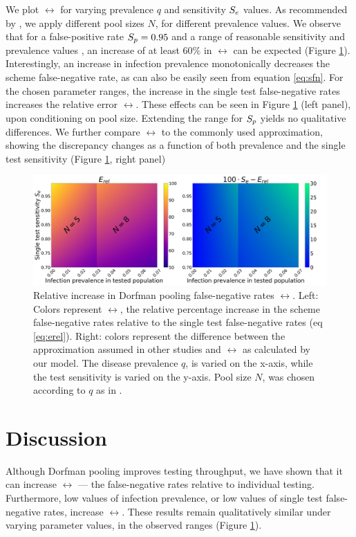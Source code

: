 \documentclass{article}
\begin{document}
We plot $\rel$ for varying prevalence $q$ and sensitivity $S_e$
values. As recommended by \cite{DorfmanYuvalDor}, we apply different
pool sizes $N$, for different prevalence values. We observe that for a
false-positive rate $S_p=0.95$ \cite{DorfmanYuvalDor} and a range of
reasonable sensitivity and prevalence values \cite{KitComparison,
  InterpretingCOVID19Test, EstimatingRatesLourenco,
  FalsePositiveEstimate}, an increase of at least $60\%$ in $\rel$ can
be expected (Figure \ref{figy}). Interestingly, an increase in
infection prevalence monotonically decreases the scheme false-negative
rate, as can also be easily seen from equation \eqref{eq:sfn}. For the
chosen parameter ranges, the increase in the single test
false-negative rates increases the relative error $\rel$. These
effects can be seen in Figure \ref{figy} (left panel), upon
conditioning on pool size. Extending the range for $S_p$ yields no
qualitative differences. We further compare $\rel$ to the commonly
used approximation, showing the discrepancy changes as a function of
both prevalence and the single test sensitivity (Figure \ref{figy},
right panel)
\begin{figure}[H]
    \centering
    \includegraphics[width=18cm]{heatmap.jpg}
    \caption{Relative increase in Dorfman pooling false-negative rates
      $\rel$. Left: Colors represent $\rel$, the relative percentage
      increase in the scheme false-negative rates relative to the
      single test false-negative rates (eq \eqref{eq:erel}). Right:
      colors represent the difference between the approximation
      assumed in other studies and $\rel$ as calculated by our
      model. The disease prevalence $q$, is varied on the x-axis,
      while the test sensitivity is varied on the y-axis. Pool size
      $N$, was chosen according to $q$ as in
      \cite{DorfmanYuvalDor}.}\label{figy}
 \end{figure}


\section{Discussion}
Although Dorfman pooling improves testing throughput, we have shown
that it can increase $\rel$ --- the false-negative rates relative to
individual testing. Furthermore, low values of infection prevalence,
or low values of single test false-negative rates, increase
$\rel$. These results remain qualitatively similar under varying
parameter values, in the observed ranges
\cite{KitComparison,EstimatingRatesKucrika, EstimatingRatesLourenco,
  InterpretingCOVID19Test} (Figure \ref{figy}).
\end{document}
